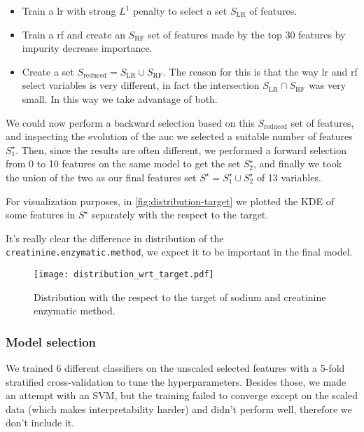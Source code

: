\begin{itemize}
    \item Train a \gls{lr} with strong $L^1$ penalty to select a set $S_\text{LR}$ of features.
    \item Train a \gls{rf} and create an $S_\text{RF}$ set of features made by the top 30 features by impurity decrease importance.
    \item Create a set $S_\text{reduced} = S_\text{LR} \cup S_\text{RF}$. The reason for this is that the way \gls{lr} and \gls{rf} select variables is very different, in fact the intersection $S_\text{LR} \cap S_\text{RF}$ was very small. In this way we take advantage of both.
\end{itemize}

We could now perform a backward selection based on this $S_\text{reduced}$ set of features, and inspecting the evolution of the \gls{auc} we selected a suitable number of features $S^\star_1$. Then, since the results are often different, we performed a forward selection from 0 to 10 features on the same model to get the set $S^\star_2$, and finally we took the union of the two as our final features set $S^\star = S^\star_1 \cup S^\star_2$ of 13 variables.

For visualization purposes, in \autoref{fig:distribution-target} we plotted the KDE of some features in $S^\star$ separately with the respect to the target.

It's really clear the difference in distribution of the \texttt{creatinine.enzymatic.method}, we expect it to be important in the final model.

\begin{figure}
    \centering
    \texttt{[image: distribution\_wrt\_target.pdf]}
    \caption{Distribution with the respect to the target of sodium and creatinine enzymatic method.}
    \label{fig:distribution-target}
\end{figure}

\subsubsection{Model selection}

We trained 6 different classifiers on the unscaled selected features with a 5-fold stratified cross-validation to tune the hyperparameters.
Besides those, we made an attempt with an SVM, but the training failed to converge except on the scaled data (which makes interpretability harder) and didn't perform well, therefore we don't include it.
